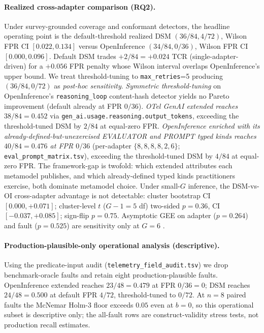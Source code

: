 \documentclass[a4paper,UKenglish,cleveref,autoref,thm-restate]{lipics-v2021}
\begin{document}
\paragraph*{Realized cross-adapter comparison (RQ2).}  Under
survey-grounded coverage and conformant detectors, the headline
operating point is the default-threshold realized DSM
$(36/84, 4/72)$, Wilson FPR CI $[0.022, 0.134]$ versus
OpenInference $(34/84, 0/36)$, Wilson FPR CI $[0.000, 0.096]$.
Default DSM trades $+2/84 = +0.024$ TCR (single-adapter-driven) for
a $+0.056$ FPR penalty whose Wilson interval overlaps OpenInference's
upper bound. We treat threshold-tuning to \texttt{max\_retries}=5
producing $(36/84, 0/72)$ as \emph{post-hoc sensitivity}.
\emph{Symmetric threshold-tuning} on OpenInference's
\texttt{reasoning\_loop} content-hash detector yields no Pareto
improvement (default already at FPR $0/36$). \emph{OTel GenAI
extended reaches $38/84 = 0.452$} via
\texttt{gen\_ai.usage.reasoning.output\_tokens}, exceeding the
threshold-tuned DSM by $2/84$ at equal-zero FPR.
\emph{OpenInference enriched with its already-defined-but-unexercised
EVALUATOR and PROMPT typed kinds reaches $40/84 = 0.476$ at FPR
$0/36$} (per-adapter $\{8,8,8,8,2,6\}$;
\texttt{eval\_prompt\_matrix.tsv}), exceeding the threshold-tuned
DSM by $4/84$ at equal-zero FPR. The framework-gap is twofold: which
extended attributes each metamodel publishes, and which already-defined
typed kinds practitioners exercise, both dominate metamodel choice.
Under small-$G$ inference, the DSM-vs-OI cross-adapter advantage
is not detectable: cluster bootstrap CI $[0.000, +0.071]$; cluster-level $t$
($G-1=5$ df) two-sided $p = 0.36$, CI $[-0.037, +0.085]$; sign-flip
$p = 0.75$. Asymptotic GEE on adapter ($p = 0.264$) and fault
($p = 0.525$) are sensitivity only at $G = 6$ \cite{cameron2015}.

\paragraph*{Production-plausible-only operational analysis (descriptive).}
Using the predicate-input audit
(\texttt{telemetry\_field\_audit.tsv}) we drop benchmark-oracle
faults and retain eight production-plausible faults. OpenInference
extended reaches $23/48 = 0.479$ at FPR $0/36 = 0$; DSM reaches
$24/48 = 0.500$ at default FPR $4/72$, threshold-tuned to $0/72$.
At $n = 8$ paired faults the McNemar Holm-3 floor exceeds $0.05$
even at $b = 0$, so this operational subset is descriptive only; the
all-fault rows are construct-validity stress tests, not production
recall estimates.
\end{document}
